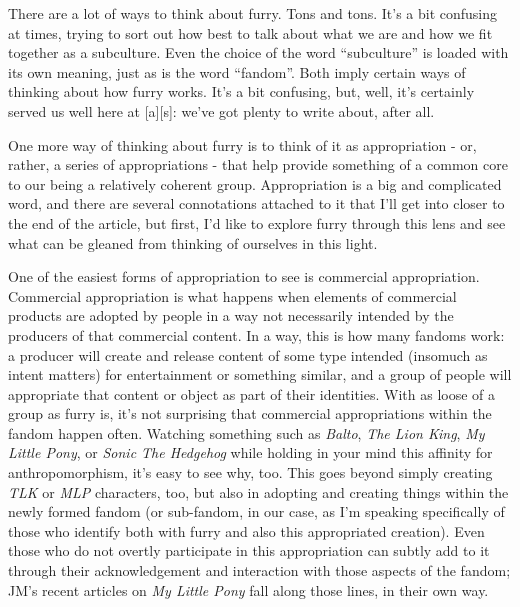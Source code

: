 There are a lot of ways to think about furry. Tons and tons. It's a bit
confusing at times, trying to sort out how best to talk about what we
are and how we fit together as a subculture. Even the choice of the word
``subculture'' is loaded with its own meaning, just as is the word
``fandom''. Both imply certain ways of thinking about how furry works.
It's a bit confusing, but, well, it's certainly served us well here at
{[}a{]}{[}s{]}: we've got plenty to write about, after all.

One more way of thinking about furry is to think of it as appropriation
- or, rather, a series of appropriations - that help provide something
of a common core to our being a relatively coherent group. Appropriation
is a big and complicated word, and there are several connotations
attached to it that I'll get into closer to the end of the article, but
first, I'd like to explore furry through this lens and see what can be
gleaned from thinking of ourselves in this light.

One of the easiest forms of appropriation to see is commercial
appropriation. Commercial appropriation is what happens when elements of
commercial products are adopted by people in a way not necessarily
intended by the producers of that commercial content. In a way, this is
how many fandoms work: a producer will create and release content of
some type intended (insomuch as intent matters) for entertainment or
something similar, and a group of people will appropriate that content
or object as part of their identities. With as loose of a group as furry
is, it's not surprising that commercial appropriations within the fandom
happen often. Watching something such as \emph{Balto}, \emph{The Lion
King}, \emph{My Little Pony}, or \emph{Sonic The Hedgehog} while holding
in your mind this affinity for anthropomorphism, it's easy to see why,
too. This goes beyond simply creating \emph{TLK} or \emph{MLP}
characters, too, but also in adopting and creating things within the
newly formed fandom (or sub-fandom, in our case, as I'm speaking
specifically of those who identify both with furry and also this
appropriated creation). Even those who do not overtly participate in
this appropriation can subtly add to it through their acknowledgement
and interaction with those aspects of the fandom; JM's recent articles
on \emph{My Little Pony} fall along those lines, in their own way.

